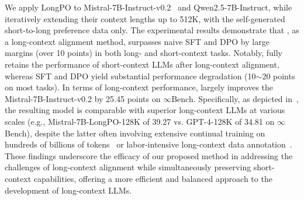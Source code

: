 
We apply LongPO to Mistral-7B-Instruct-v0.2~\citep{Jiang2023Mistral7} and Qwen2.5-7B-Instruct, while iteratively extending their context lengths up to 512K, with the self-generated short-to-long preference data only.
The experimental results demonstrate that \ourMethod{}, as a long-context alignment method,
surpasses naive SFT and DPO by large margins (over 10 points) in both long- and short-context tasks. Notably, \ourMethod{} fully retains the performance of short-context LLMs after long-context alignment, whereas SFT and DPO  yield substantial performance degradation (10$\sim$20 points on most tasks). In terms of long-context performance, \ourMethod{} largely improves the Mistral-7B-Instruct-v0.2 by 25.45 points on $\infty$Bench. Specifically, as depicted in~, the resulting model is comparable with superior long-context LLMs at various scales (e.g., Mistral-7B-LongPO-128K of 39.27 vs. GPT-4-128K of 34.81 on $\infty$Bench), despite the latter often involving extensive continual training on hundreds of billions of tokens~\citep{dubey2024llama3herdmodels} or labor-intensive long-context data annotation~\citep{Zeng2024ChatGLMAF}. These findings underscore the efficacy of our proposed method in addressing the challenges of long-context alignment while simultaneously preserving short-context capabilities, offering a more efficient and balanced approach to the development of long-context LLMs.






